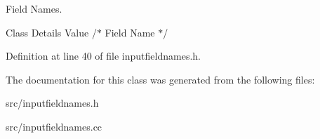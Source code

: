 Field Names. 

Class Details Value /$\ast$ Field Name $\ast$/ 

Definition at line 40 of file inputfieldnames.\-h.



The documentation for this class was generated from the following files\-:\begin{DoxyCompactItemize}
\item 
src/inputfieldnames.\-h\item 
src/inputfieldnames.\-cc\end{DoxyCompactItemize}
